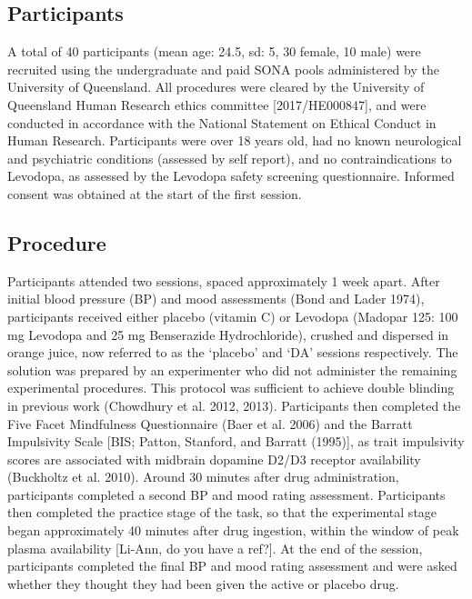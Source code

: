 \documentclass{article}
\begin{document}
\label{sec:Methods}

\hypertarget{participants}{%
\subsection{Participants}\label{participants}}

A total of 40 participants (mean age: 24.5, sd: 5, 30 female, 10 male)
were recruited using the undergraduate and paid SONA pools administered
by the University of Queensland. All procedures were cleared by the
University of Queensland Human Research ethics committee
{[}2017/HE000847{]}, and were conducted in accordance with the National
Statement on Ethical Conduct in Human Research. Participants were over
18 years old, had no known neurological and psychiatric conditions
(assessed by self report), and no contraindications to Levodopa, as
assessed by the Levodopa safety screening questionnaire. Informed
consent was obtained at the start of the first session.

\hypertarget{procedure}{%
\subsection{Procedure}\label{procedure}}

Participants attended two sessions, spaced approximately 1 week apart.
After initial blood pressure (BP) and mood assessments (Bond and Lader
1974), participants received either placebo (vitamin C) or Levodopa
(Madopar 125: 100 mg Levodopa and 25 mg Benserazide Hydrochloride),
crushed and dispersed in orange juice, now referred to as the `placebo'
and `DA' sessions respectively. The solution was prepared by an
experimenter who did not administer the remaining experimental
procedures. This protocol was sufficient to achieve double blinding in
previous work (Chowdhury et al. 2012, 2013). Participants then completed
the Five Facet Mindfulness Questionnaire (Baer et al. 2006) and the
Barratt Impulsivity Scale {[}BIS; Patton, Stanford, and Barratt
(1995){]}, as trait impulsivity scores are associated with midbrain
dopamine D2/D3 receptor availability (Buckholtz et al. 2010). Around 30
minutes after drug administration, participants completed a second BP
and mood rating assessment. Participants then completed the practice
stage of the task, so that the experimental stage began approximately 40
minutes after drug ingestion, within the window of peak plasma
availability {[}Li-Ann, do you have a ref?{]}. At the end of the
session, participants completed the final BP and mood rating assessment
and were asked whether they thought they had been given the active or
placebo drug.
\end{document}
